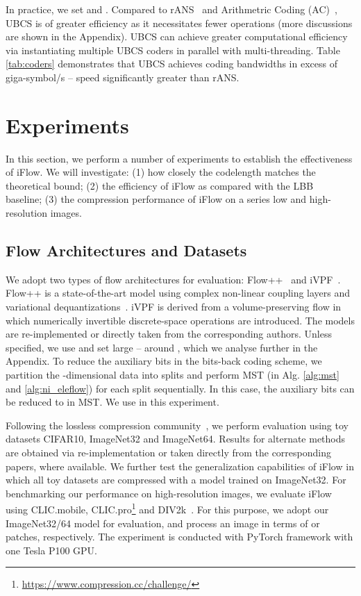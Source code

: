 \documentclass{article}
\begin{document}
In practice, we set  and . Compared to rANS~\cite{duda2013asymmetric} and Arithmetric Coding (AC)~\cite{witten1987arithmetic}, UBCS is of greater efficiency as it necessitates fewer operations (more discussions are shown in the Appendix). UBCS can achieve greater computational efficiency via instantiating multiple UBCS coders in parallel with multi-threading. Table \ref{tab:coders} demonstrates that UBCS achieves coding bandwidths in excess of giga-symbol/s -- speed significantly greater than rANS.

\section{Experiments}
\label{sec:exp}

In this section, we perform a number of experiments to establish the effectiveness of iFlow. We will investigate: (1) how closely the codelength matches the theoretical bound; (2) the efficiency of iFlow as compared with the LBB~\cite{ho2019compression} baseline; (3) the compression performance of iFlow on a series low and high-resolution images. 


\subsection{Flow Architectures and Datasets}

We adopt two types of flow architectures for evaluation: Flow++~\cite{ho2019flow++} and iVPF~\cite{zhang2021ivpf}. Flow++ is a state-of-the-art model using complex non-linear coupling layers and variational dequantizations~\cite{hoogeboom2020learning}. iVPF is derived from a volume-preserving flow in which numerically invertible discrete-space operations are introduced. The models are re-implemented or directly taken from the corresponding authors. 
Unless specified, we use  and set large  -- around , which we analyse further in the Appendix. To reduce the auxiliary bits in the bits-back coding scheme, we partition the -dimensional data into  splits and perform MST (in Alg. \ref{alg:mst} and \ref{alg:ni_eleflow}) for each split sequentially. In this case, the auxiliary bits can be reduced to  in MST. We use  in this experiment.

Following the lossless compression community~\cite{ho2019flow++,berg2020idf++,hoogeboom2019integer,townsend2019hilloc,zhang2021ivpf}, we perform evaluation using toy datasets CIFAR10, ImageNet32 and ImageNet64. Results for alternate methods are obtained via re-implementation or taken directly from the corresponding papers, where available. We further test the generalization capabilities of iFlow in which all toy datasets are compressed with a model trained on ImageNet32. For benchmarking our performance on high-resolution images, we evaluate iFlow using CLIC.mobile, CLIC.pro\footnote{\url{https://www.compression.cc/challenge/}} and DIV2k~\cite{agustsson2017ntire}. For this purpose, we adopt our ImageNet32/64 model for evaluation, and process an image in terms of  or  patches, respectively. The experiment is conducted with PyTorch framework with one Tesla P100 GPU.
\end{document}
